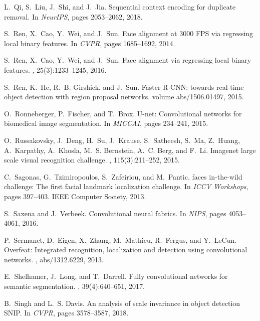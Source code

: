 \documentclass[10pt,twocolumn,letterpaper]{article}
\begin{document}
{\begin{thebibliography}{100}
L.~Qi, S.~Liu, J.~Shi, and J.~Jia.
\newblock Sequential context encoding for duplicate removal.
\newblock In {\em {NeurIPS}}, pages 2053--2062, 2018.

S.~Ren, X.~Cao, Y.~Wei, and J.~Sun.
\newblock Face alignment at 3000 {FPS} via regressing local binary features.
\newblock In {\em {CVPR}}, pages 1685--1692, 2014.

S.~Ren, X.~Cao, Y.~Wei, and J.~Sun.
\newblock Face alignment via regressing local binary features.
, 25(3):1233--1245, 2016.

S.~Ren, K.~He, R.~B. Girshick, and J.~Sun.
\newblock Faster {R-CNN:} towards real-time object detection with region
  proposal networks.
\newblock volume abs/1506.01497, 2015.

O.~Ronneberger, P.~Fischer, and T.~Brox.
\newblock U-net: Convolutional networks for biomedical image segmentation.
\newblock In {\em {MICCAI}}, pages 234--241, 2015.

O.~Russakovsky, J.~Deng, H.~Su, J.~Krause, S.~Satheesh, S.~Ma, Z.~Huang,
  A.~Karpathy, A.~Khosla, M.~S. Bernstein, A.~C. Berg, and F.~Li.
\newblock Imagenet large scale visual recognition challenge.
, 115(3):211--252,
  2015.

C.~Sagonas, G.~Tzimiropoulos, S.~Zafeiriou, and M.~Pantic.
 faces in-the-wild challenge: The first facial landmark
  localization challenge.
\newblock In {\em {ICCV} Workshops}, pages 397--403. {IEEE} Computer Society,
  2013.

S.~Saxena and J.~Verbeek.
\newblock Convolutional neural fabrics.
\newblock In {\em NIPS}, pages 4053--4061, 2016.

P.~Sermanet, D.~Eigen, X.~Zhang, M.~Mathieu, R.~Fergus, and Y.~LeCun.
\newblock Overfeat: Integrated recognition, localization and detection using
  convolutional networks.
, abs/1312.6229, 2013.

E.~Shelhamer, J.~Long, and T.~Darrell.
\newblock Fully convolutional networks for semantic segmentation.
, 39(4):640--651,
  2017.

B.~Singh and L.~S. Davis.
\newblock An analysis of scale invariance in object detection {\-} {SNIP}.
\newblock In {\em {CVPR}}, pages 3578--3587, 2018.


\end{thebibliography}}
\end{document}
